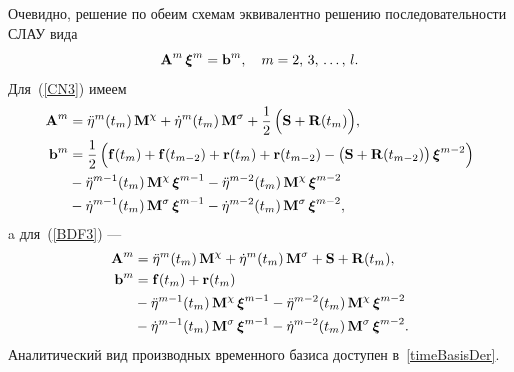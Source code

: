 Очевидно, решение по обеим схемам эквивалентно решению последовательности СЛАУ вида
\begin{equation*}
	\boldsymbol{\mathbf{A}}^m \, \boldsymbol{\mathbf{\xi}}^m = \boldsymbol{\mathbf{b}}^m, \quad m = 2, \, 3, \, \dots, \, l.
\end{equation*} 
Для~(\ref{CN3}) имеем
\begin{subequations}
	\label{CN3_Ab}
	\begin{align}
		\boldsymbol{\mathbf{A}}^m &=
		\ddot{\eta}^{m}(t_m) \, \boldsymbol{\mathbf{M}}^\chi +
		\dot{\eta}^{m}(t_m) \, \boldsymbol{\mathbf{M}}^\sigma +
		\frac{1}{2} \, \Big(
			\boldsymbol{\mathbf{S}} +
			\boldsymbol{\mathbf{R}}(t_m) 
		\Big), \label{CN3_A} 
		\\
		\boldsymbol{\mathbf{b}}^m &=
		\frac{1}{2} \, \Big( 
				\boldsymbol{\mathbf{f}}(t_m) + \boldsymbol{\mathbf{f}}(t_{m-2}) + 
				\boldsymbol{\mathbf{r}}(t_m) + \boldsymbol{\mathbf{r}}(t_{m-2}) -
				\big( \boldsymbol{\mathbf{S}} + \boldsymbol{\mathbf{R}}(t_{m-2}) \big) \, \boldsymbol{\mathbf{\xi}}^{m-2}
			\Big) \nonumber \\
		&-
		\ddot{\eta}^{m-1}(t_m) \, \boldsymbol{\mathbf{M}}^\chi \, \boldsymbol{\mathbf{\xi}}^{m-1} -
		\ddot{\eta}^{m-2}(t_m) \, \boldsymbol{\mathbf{M}}^\chi \, \boldsymbol{\mathbf{\xi}}^{m-2} \nonumber \\
		&-
		\dot{\eta}^{m-1}(t_m) \, \boldsymbol{\mathbf{M}}^\sigma \, \boldsymbol{\mathbf{\xi}}^{m-1} -
		\dot{\eta}^{m-2}(t_m) \, \boldsymbol{\mathbf{M}}^\sigma \, \boldsymbol{\mathbf{\xi}}^{m-2}, \label{CN3_b} 
	\end{align}
\end{subequations}
a для~(\ref{BDF3}) ---
\begin{subequations}
	\label{BDF3_Ab}
	\begin{align}
		\boldsymbol{\mathbf{A}}^m &=
		\ddot{\eta}^{m}(t_m) \, \boldsymbol{\mathbf{M}}^\chi +
		\dot{\eta}^{m}(t_m) \, \boldsymbol{\mathbf{M}}^\sigma +
		\boldsymbol{\mathbf{S}} +
		\boldsymbol{\mathbf{R}}(t_m), \label{BDF3_A} 
		\\
		\boldsymbol{\mathbf{b}}^m &=
		\boldsymbol{\mathbf{f}}(t_m) + 
		\boldsymbol{\mathbf{r}}(t_m) \nonumber \\
		&-
		\ddot{\eta}^{m-1}(t_m) \, \boldsymbol{\mathbf{M}}^\chi \, \boldsymbol{\mathbf{\xi}}^{m-1} - 
		\ddot{\eta}^{m-2}(t_m) \, \boldsymbol{\mathbf{M}}^\chi \, \boldsymbol{\mathbf{\xi}}^{m-2} \nonumber \\
		&-
		\dot{\eta}^{m-1}(t_m) \, \boldsymbol{\mathbf{M}}^\sigma \, \boldsymbol{\mathbf{\xi}}^{m-1} -
		\dot{\eta}^{m-2}(t_m) \, \boldsymbol{\mathbf{M}}^\sigma \, \boldsymbol{\mathbf{\xi}}^{m-2}. \label{BDF3_b} 
	\end{align}
\end{subequations}
Аналитический вид производных временного базиса доступен в~\ref{timeBasisDer}.

